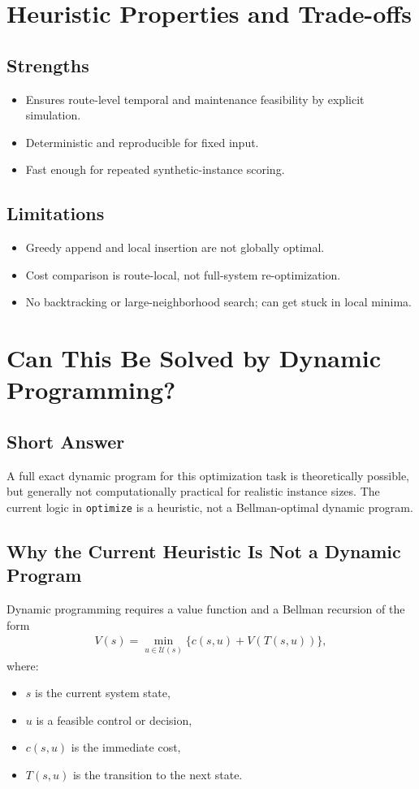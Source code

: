 \documentclass[11pt,a4paper]{article}
\begin{document}
\section{Heuristic Properties and Trade-offs}
\subsection{Strengths}
\begin{itemize}[leftmargin=1.4em]
    \item Ensures route-level temporal and maintenance feasibility by explicit simulation.
    \item Deterministic and reproducible for fixed input.
    \item Fast enough for repeated synthetic-instance scoring.
\end{itemize}

\subsection{Limitations}
\begin{itemize}[leftmargin=1.4em]
    \item Greedy append and local insertion are not globally optimal.
    \item Cost comparison is route-local, not full-system re-optimization.
    \item No backtracking or large-neighborhood search; can get stuck in local minima.
\end{itemize}

\section{Can This Be Solved by Dynamic Programming?}

\subsection{Short Answer}
A full exact dynamic program for this optimization task is theoretically possible, but generally not computationally practical for realistic instance sizes. The current logic in \texttt{optimize} is a heuristic, not a Bellman-optimal dynamic program.

\subsection{Why the Current Heuristic Is Not a Dynamic Program}
Dynamic programming requires a value function and a Bellman recursion of the form
\begin{align*}
V(s) = \min_{u \in \mathcal{U}(s)} \{ c(s,u) + V(T(s,u)) \},
\end{align*}
where:
\begin{itemize}[leftmargin=1.4em]
    \item $s$ is the current system state,
    \item $u$ is a feasible control or decision,
    \item $c(s,u)$ is the immediate cost,
    \item $T(s,u)$ is the transition to the next state.
\end{itemize}
\end{document}
